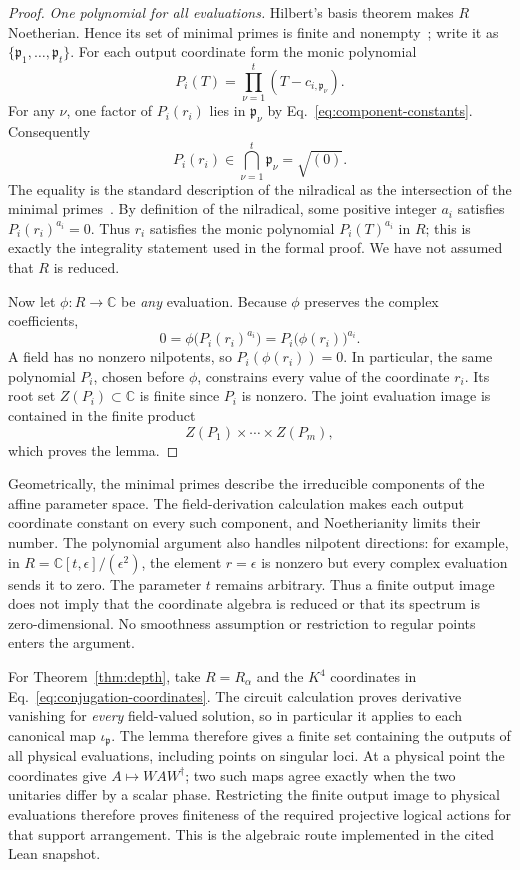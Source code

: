 \documentclass[aps,prl,reprint,notitlepage,nofootinbib,nobibnotes]{revtex4-2}
\begin{document}
\begin{proof}
\emph{One polynomial for all evaluations.}
Hilbert's basis theorem makes \(R\) Noetherian. Hence its set of
minimal primes is finite and nonempty~\cite{Stacks}; write it as
\(\{\mathfrak p_1,\ldots,\mathfrak p_t\}\).
For each output coordinate form the monic polynomial
\[
 P_i(T)=\prod_{\nu=1}^{t}(T-c_{i,\mathfrak p_\nu}).
\]
For any \(\nu\), one factor of \(P_i(r_i)\) lies in
\(\mathfrak p_\nu\) by Eq.~\eqref{eq:component-constants}.
Consequently
\[
 P_i(r_i)\in
 \bigcap_{\nu=1}^{t}\mathfrak p_\nu=\sqrt{(0)}.
\]
The equality is the standard description of the nilradical as the
intersection of the minimal primes~\cite{Stacks}.
By definition of the nilradical, some positive integer \(a_i\)
satisfies \(P_i(r_i)^{a_i}=0\).
Thus \(r_i\) satisfies the monic polynomial \(P_i(T)^{a_i}\) in \(R\);
this is exactly the integrality statement used in the formal proof.
We have not assumed that \(R\) is reduced.

Now let \(\phi:R\to\mathbb C\) be \emph{any} evaluation.
Because \(\phi\) preserves the complex coefficients,
\[
 0=\phi\bigl(P_i(r_i)^{a_i}\bigr)
   =P_i\bigl(\phi(r_i)\bigr)^{a_i}.
\]
A field has no nonzero nilpotents, so \(P_i(\phi(r_i))=0\).
In particular, the same polynomial \(P_i\), chosen before \(\phi\),
constrains every value of the coordinate \(r_i\).
Its root set \(Z(P_i)\subset\mathbb C\) is finite since \(P_i\) is
nonzero. The joint evaluation image is contained in the finite product
\[
 Z(P_1)\times\cdots\times Z(P_m),
\]
which proves the lemma.
\end{proof}

Geometrically, the minimal primes describe the irreducible components
of the affine parameter space. The field-derivation calculation makes
each output coordinate constant on every such component, and
Noetherianity limits their number. The polynomial argument also
handles nilpotent directions: for example, in
\(R=\mathbb C[t,\epsilon]/(\epsilon^2)\), the element
\(r=\epsilon\) is nonzero but every complex evaluation sends it to
zero. The parameter \(t\) remains arbitrary. Thus a finite output
image does not imply that the coordinate algebra is reduced or that
its spectrum is zero-dimensional. No smoothness assumption or
restriction to regular points enters the argument.

For Theorem~\ref{thm:depth}, take \(R=R_\alpha\) and the \(K^4\)
coordinates in Eq.~\eqref{eq:conjugation-coordinates}.
The circuit calculation proves derivative vanishing for \emph{every}
field-valued solution, so in particular it applies to each canonical
map \(\iota_{\mathfrak p}\).
The lemma therefore gives a finite set containing the outputs of
all physical evaluations, including points on singular loci.
At a physical point the coordinates give \(A\mapsto WAW^\dagger\);
two such maps agree exactly when the two unitaries differ by a scalar
phase. Restricting the finite output image to physical evaluations
therefore proves finiteness of the required projective logical
actions for that support arrangement. This is the algebraic route
implemented in the cited Lean snapshot.
\end{document}
